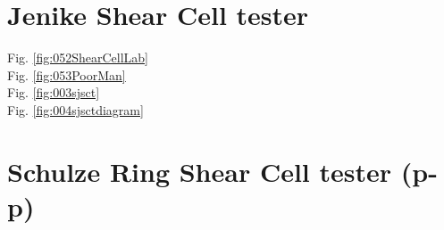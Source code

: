 \section{Jenike Shear Cell tester}
\label{sec:jsct}

Fig. \ref{fig:052ShearCellLab} \\
Fig. \ref{fig:053PoorMan} \\




Fig. \ref{fig:003sjsct} \\


Fig. \ref{fig:004sjsctdiagram} \\


\section{Schulze Ring Shear Cell tester (p-p)}
\label{sec:SRSCT}

